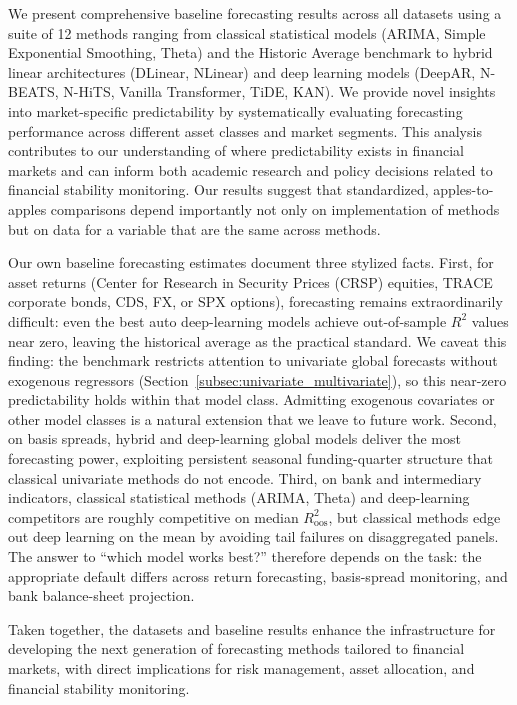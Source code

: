 \documentclass{article}
\begin{document}
We present comprehensive baseline forecasting results across all datasets using a suite of 12 methods ranging from classical statistical models (ARIMA, Simple Exponential Smoothing, Theta) and the Historic Average benchmark to hybrid linear architectures (DLinear, NLinear) and deep learning models (DeepAR, N-BEATS, N-HiTS, Vanilla Transformer, TiDE, KAN). We provide novel insights into market-specific predictability by systematically evaluating forecasting performance across different asset classes and market segments. This analysis contributes to our understanding of where predictability exists in financial markets and can inform both academic research and policy decisions related to financial stability monitoring. Our results suggest that standardized, apples-to-apples comparisons depend importantly not only on implementation of methods but on data for a variable that are the same across methods.

Our own baseline forecasting estimates document three stylized facts. First, for asset returns (Center for Research in Security Prices (CRSP) equities, TRACE corporate bonds, CDS, FX, or SPX options), forecasting remains extraordinarily difficult: even the best auto deep-learning models achieve out-of-sample $R^2$ values near zero, leaving the historical average as the practical standard. We caveat this finding: the benchmark restricts attention to univariate global forecasts without exogenous regressors (Section~\ref{subsec:univariate_multivariate}), so this near-zero predictability holds within that model class. Admitting exogenous covariates or other model classes is a natural extension that we leave to future work. Second, on basis spreads, hybrid and deep-learning global models deliver the most forecasting power, exploiting persistent seasonal funding-quarter structure that classical univariate methods do not encode. Third, on bank and intermediary indicators, classical statistical methods (ARIMA, Theta) and deep-learning competitors are roughly competitive on median $R^2_{\text{oos}}$, but classical methods edge out deep learning on the mean by avoiding tail failures on disaggregated panels. The answer to ``which model works best?'' therefore depends on the task: the appropriate default differs across return forecasting, basis-spread monitoring, and bank balance-sheet projection.

Taken together, the datasets and baseline results enhance the infrastructure for developing the next generation of forecasting methods tailored to financial markets, with direct implications for risk management, asset allocation, and financial stability monitoring.
\end{document}
